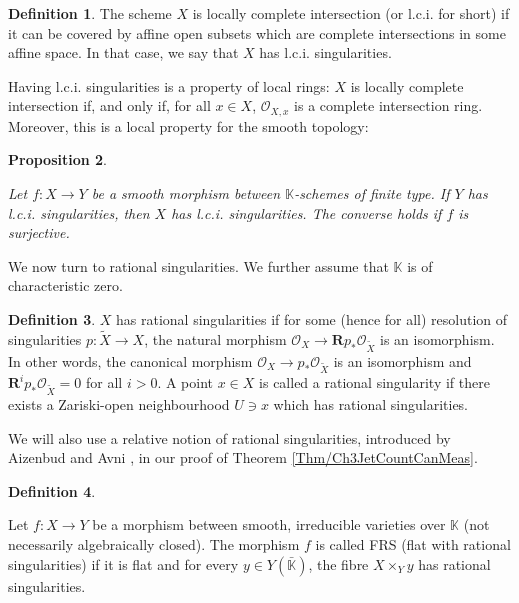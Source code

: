 \documentclass[11pt,english]{article}
\numberwithin{equation}{section}
\numberwithin{figure}{section}
\theoremstyle{definition}
\newtheorem{df}{Definition}[subsection]
\theoremstyle{plain}
\newtheorem{prop}[df]{Proposition}
\theoremstyle{remark}
\newcommand\KK{\mathbb{K}}
\begin{document}
\begin{df}

The scheme $X$ is locally complete intersection (or l.c.i. for short)
if it can be covered by affine open subsets which are complete intersections
in some affine space. In that case, we say that $X$ has l.c.i. singularities.

\end{df}

Having l.c.i. singularities is a property of local rings: $X$ is
locally complete intersection if, and only if, for all $x\in X$,
$\mathcal{O}_{X,x}$ is a complete intersection ring. Moreover, this
is a local property for the smooth topology:

\begin{prop}{\cite[\href{https://stacks.math.columbia.edu/tag/069P}{Tag 069P}]{SP}}
\label{Lem/LciSgDesc}

Let $f:X\rightarrow Y$ be a smooth morphism between $\KK$-schemes
of finite type. If $Y$ has l.c.i. singularities, then $X$ has l.c.i.
singularities. The converse holds if $f$ is surjective.

\end{prop}

We now turn to rational singularities. We further assume that $\KK$
is of characteristic zero.

\begin{df}

$X$ has rational singularities if for some (hence for all) resolution
of singularities $p:\tilde{X}\rightarrow X$, the natural morphism
$\mathcal{O}_{X}\rightarrow\textbf{R}p_{*}\mathcal{O}_{\tilde{X}}$
is an isomorphism. In other words, the canonical morphism $\mathcal{O}_{X}\rightarrow p_{*}\mathcal{O}_{\tilde{X}}$
is an isomorphism and $\textbf{R}^{i}p_{*}\mathcal{O}_{\tilde{X}}=0$
for all $i>0$. A point $x\in X$ is called a rational singularity
if there exists a Zariski-open neighbourhood $U\ni x$ which has rational
singularities.

\end{df}

We will also use a relative notion of rational singularities, introduced
by Aizenbud and Avni \cite{AA16}, in our proof of Theorem \ref{Thm/Ch3JetCountCanMeas}.

\begin{df}{\cite[Def. II.]{AA16}}

Let $f:X\rightarrow Y$ be a morphism between smooth, irreducible
varieties over $\KK$ (not necessarily algebraically closed). The
morphism $f$ is called FRS (flat with rational singularities) if
it is flat and for every $y\in Y(\bar{\KK})$, the fibre $X\times_{Y}y$
has rational singularities.

\end{df}
\end{document}

